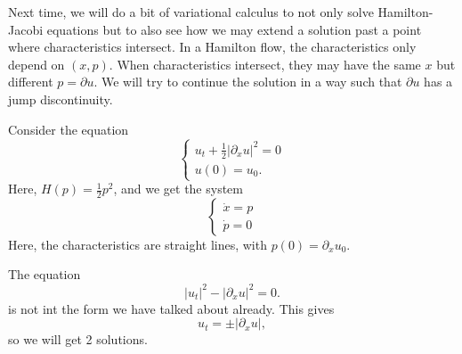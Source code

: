 Next time, we will do a bit of variational calculus to not only solve Hamilton-Jacobi equations but to also see how we may extend a solution past a point where characteristics intersect. In a Hamilton flow, the characteristics only depend on $(x,p)$. When characteristics intersect, they may have the same $x$ but different $p=\partial u$. We will try to continue the solution in a way such that $\partial u$ has a jump discontinuity.

\begin{example}
    Consider the equation 
    \[
    \begin{cases}
        u_t + \frac 1 2 | \partial_x u|^2 = 0 \\
        u(0) = u_0.
    \end{cases}
    \]
    Here, $H(p) = \frac 1 2 p^2$, and we get the system 
    \[
    \begin{cases}
        \dot x = p\\
        \dot p = 0
    \end{cases}
    \]
    Here, the characteristics are straight lines, with $p(0)=\partial_x u_0$.
\end{example}

\begin{example}
     The equation 
    \[
        |u_t|^2 -|\partial_x u|^2 = 0.
    \]
    is not int the form we have talked about already. This gives 
    \[
        u_t = \pm |\partial_x u|,
    \]
    so we will get 2 solutions.
\end{example}
